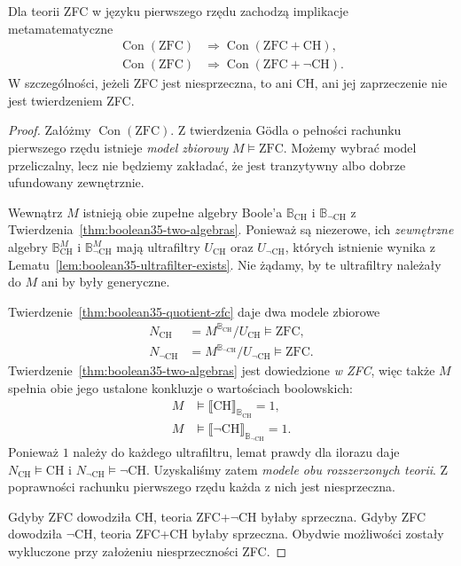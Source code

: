 \begin{twierdzenie}
\label{thm:boolean35-relative-consistency}
Dla teorii ZFC w języku
pierwszego rzędu zachodzą
implikacje metamatematyczne
\[
\begin{aligned}
 \operatorname{Con}(\mathrm{ZFC})
 &\Longrightarrow
   \operatorname{Con}(\mathrm{ZFC}+\mathrm{CH}),\\
 \operatorname{Con}(\mathrm{ZFC})
 &\Longrightarrow
   \operatorname{Con}(\mathrm{ZFC}+\neg\mathrm{CH}).
\end{aligned}
\]
W szczególności, jeżeli ZFC
jest niesprzeczna, to ani CH,
ani jej zaprzeczenie nie jest
twierdzeniem ZFC.
\end{twierdzenie}
\begin{proof}
Załóżmy $\operatorname{Con}(\mathrm{ZFC})$.
Z twierdzenia Gödla o pełności
rachunku pierwszego rzędu
istnieje \emph{model zbiorowy}
$M\models\mathrm{ZFC}$.
Możemy wybrać model przeliczalny,
lecz nie będziemy zakładać,
że jest tranzytywny albo
dobrze ufundowany zewnętrznie.

Wewnątrz $M$ istnieją obie
zupełne algebry Boole'a
$\mathbb B_{\mathrm{CH}}$
i $\mathbb B_{\neg\mathrm{CH}}$
z Twierdzenia~\ref{thm:boolean35-two-algebras}.
Ponieważ są niezerowe,
ich \emph{zewnętrzne} algebry
$\mathbb B_{\mathrm{CH}}^M$ i
$\mathbb B_{\neg\mathrm{CH}}^M$
mają ultrafiltry
$U_{\mathrm{CH}}$ oraz
$U_{\neg\mathrm{CH}}$,
których istnienie wynika z
Lematu~\ref{lem:boolean35-ultrafilter-exists}.
Nie żądamy, by te ultrafiltry
należały do $M$ ani by
były generyczne.

Twierdzenie~\ref{thm:boolean35-quotient-zfc}
daje dwa modele zbiorowe
\[
\begin{aligned}
 N_{\mathrm{CH}}
    &=M^{\mathbb B_{\mathrm{CH}}}/U_{\mathrm{CH}}
        \models\mathrm{ZFC},\\
 N_{\neg\mathrm{CH}}
    &=M^{\mathbb B_{\neg\mathrm{CH}}}/U_{\neg\mathrm{CH}}
        \models\mathrm{ZFC}.
\end{aligned}
\]
Twierdzenie~\ref{thm:boolean35-two-algebras}
jest dowiedzione \emph{w ZFC},
więc także $M$ spełnia obie
jego ustalone konkluzje o
wartościach boolowskich:
\[
\begin{aligned}
 M&\models
  \llbracket\mathrm{CH}\rrbracket_{
                \mathbb B_{\mathrm{CH}}}=1,\\
 M&\models
  \llbracket\neg\mathrm{CH}\rrbracket_{
                \mathbb B_{\neg\mathrm{CH}}}=1.
\end{aligned}
\]
Ponieważ $1$ należy do każdego
ultrafiltru, lemat prawdy
dla ilorazu daje
$N_{\mathrm{CH}}\models\mathrm{CH}$
i
$N_{\neg\mathrm{CH}}\models\neg\mathrm{CH}$.
Uzyskaliśmy zatem
\emph{modele obu rozszerzonych teorii}.
Z poprawności rachunku
pierwszego rzędu każda
z nich jest niesprzeczna.

Gdyby ZFC dowodziła CH,
teoria ZFC+$\neg$CH
byłaby sprzeczna.
Gdyby ZFC dowodziła $\neg$CH,
teoria ZFC+CH byłaby
sprzeczna. Obydwie możliwości
zostały wykluczone przy
założeniu niesprzeczności ZFC.
\end{proof}

